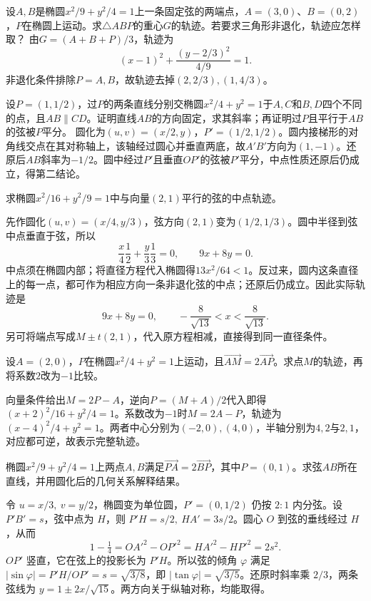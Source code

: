设\(A,B\)是椭圆\(x^2/9+y^2/4=1\)上一条固定弦的两端点，\(A=(3,0)\)、\(B=(0,2)\)，\(P\)在椭圆上运动。求\(\triangle ABP\)的重心\(G\)的轨迹。若要求三角形非退化，轨迹应怎样取？
\solutionanswer
由\(G=(A+B+P)/3\)，轨迹为
\[
(x-1)^2+\frac{(y-2/3)^2}{4/9}=1.
\]
非退化条件排除\(P=A,B\)，故轨迹去掉\((2,2/3),(1,4/3)\)。


设\(P=(1,1/2)\)，过\(P\)的两条直线分别交椭圆\(x^2/4+y^2=1\)于\(A,C\)和\(B,D\)四个不同的点，且\(AB\parallel CD\)。证明直线\(AB\)的方向固定，求其斜率；再证明过\(P\)且平行于\(AB\)的弦被\(P\)平分。
\solutionanswer
圆化为\((u,v)=(x/2,y)\)，\(P'=(1/2,1/2)\)。圆内接梯形的对角线交点在其对称轴上，该轴经过圆心并垂直两底，故\(A'B'\)方向为\((1,-1)\)。还原后\(AB\)斜率为\(-1/2\)。圆中经过\(P'\)且垂直\(OP'\)的弦被\(P'\)平分，中点性质还原后仍成立，得第二结论。


求椭圆\(x^2/16+y^2/9=1\)中与向量\((2,1)\)平行的弦的中点轨迹。
\par
\solutionanswer
先作圆化\((u,v)=(x/4,y/3)\)，弦方向\((2,1)\)变为\((1/2,1/3)\)。圆中半径到弦中点垂直于弦，所以
\[
 \frac{x}{4}\frac12+\frac{y}{3}\frac13=0,
 \qquad 9x+8y=0.
\]
中点须在椭圆内部；将直径方程代入椭圆得\(13x^2/64<1\)。反过来，圆内这条直径上的每一点，都可作为相应方向一条非退化弦的中点；还原后仍成立。因此实际轨迹是
\[
 9x+8y=0,\qquad -\frac8{\sqrt{13}}<x<\frac8{\sqrt{13}}.
\]
另可将端点写成\(M\pm t(2,1)\)，代入原方程相减，直接得到同一直径条件。


设\(A=(2,0)\)，\(P\)在椭圆\(x^2/4+y^2=1\)上运动，且\(\overrightarrow{AM}=2\overrightarrow{AP}\)。求点\(M\)的轨迹，再将系数\(2\)改为\(-1\)比较。
\par
\solutionanswer
向量条件给出\(M=2P-A\)，逆向\(P=(M+A)/2\)代入即得\((x+2)^2/16+y^2/4=1\)。系数改为\(-1\)时\(M=2A-P\)，轨迹为\((x-4)^2/4+y^2=1\)。两者中心分别为\((-2,0),(4,0)\)，半轴分别为\(4,2\)与\(2,1\)，对应都可逆，故表示完整轨迹。


椭圆\(x^2/9+y^2/4=1\)上两点\(A,B\)满足\(\overrightarrow{PA}=2\overrightarrow{BP}\)，其中\(P=(0,1)\)。求弦\(AB\)所在直线，并用圆化后的几何关系解释结果。
\par
\solutionanswer
令 \(u=x/3,\ v=y/2\)，椭圆变为单位圆，\(P'=(0,1/2)\) 仍按 \(2:1\) 内分弦。设 \(P'B'=s\)，弦中点为 \(H\)，则 \(P'H=s/2,\ HA'=3s/2\)。圆心 \(O\) 到弦的垂线经过 \(H\)，从而
\[
  1-\tfrac14=OA'^2-OP'^2=HA'^2-HP'^2=2s^2 .
\]
\(OP'\) 竖直，它在弦上的投影长为 \(P'H\)。所以弦的倾角 \(\varphi\) 满足 \(|\sin\varphi|=P'H/OP'=s=\sqrt{3/8}\)，即 \(|\tan\varphi|=\sqrt{3/5}\)。还原时斜率乘 \(2/3\)，两条弦线为 \(y=1\pm2x/\sqrt{15}\)。两方向关于纵轴对称，均能取得。


